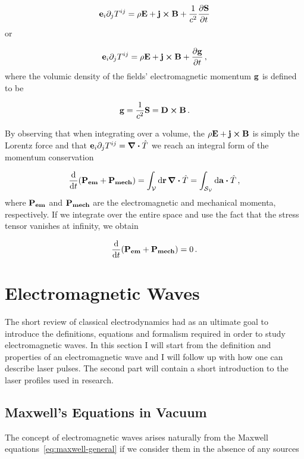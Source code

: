 \documentclass[12pt, class=report, crop=false]{standalone}
\begin{document}
\begin{equation}
  \vb{e}_{i} \partial_{j} T^{ij} = \rho \vb{E} + \vb{j}\cp\vb{B} + \frac{1}{c^{2}} \pdv{\vb{S}}{t}
\end{equation}
or

\begin{equation}
  \vb{e}_{i} \partial_{j} T^{ij} = \rho \vb{E} + \vb{j}\cp\vb{B} + \pdv{\vb{g}}{t}  \,,
\end{equation}
where the volumic density of the fields' electromagnetic momentum \(\vb{g}\) is defined to be

\begin{equation}
  \label{def:electromagnetic-momentum}
  \vb{g} = \frac{1}{c^{2}} \vb{S} = \vb{D}\cp \vb{B} \,.
\end{equation}

\par
By observing that when integrating over a volume, the \(\rho \vb{E} + \vb{j}\cp\vb{B}\) is simply the Lorentz force and that \(\vb{e}_{i} \partial_{j} T^{ij} = \div{\hat{T}}\) we reach an integral form of the momentum conservation

\begin{equation}
  \dv{t} (\vb{P_{em}}+\vb{P_{mech}}) = \int_\mathcal{V} \dd{\vb{r}} \div{\hat{T}} = \int_{\mathcal{S}_\mathcal{V}} \dd{\vb{a}} \vdot \hat{T} \,,
\end{equation}
where \(\vb{P_{em}}\) and \(\vb{P_{mech}}\) are the electromagnetic and mechanical momenta, respectively. If we integrate over the entire space and use the fact that the stress tensor vanishes at infinity, we obtain

\begin{equation}
  \dv{t} (\vb{P_{em}}+\vb{P_{mech}}) = 0 \,.
\end{equation}

\section{Electromagnetic Waves}
The short review of classical electrodynamics had as an ultimate goal to introduce the definitions, equations and formalism required in order to study electromagnetic waves. In this section I will start from the definition and properties of an electromagnetic wave and I will follow up with how one can describe laser pulses. The second part will contain a short introduction to the laser profiles used in research.

\subsection{Maxwell's Equations in Vacuum}
The concept of electromagnetic waves arises naturally from the Maxwell equations~\cref{eq:maxwell-general} if we consider them in the absence of any sources
\end{document}
